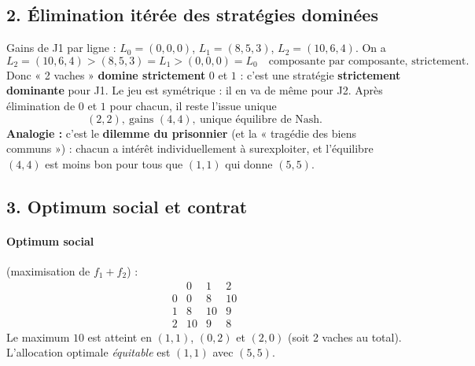 \documentclass[11pt,a4paper]{article}
\begin{document}
\subsection*{2. Élimination itérée des stratégies dominées}
Gains de J1 par ligne : $L_0=(0,0,0)$, $L_1=(8,5,3)$, $L_2=(10,6,4)$. On a
\[
L_2=(10,6,4)>(8,5,3)=L_1>(0,0,0)=L_0 \quad\text{composante par composante, strictement.}
\]
Donc « 2 vaches » \textbf{domine strictement} $0$ et $1$ : c'est une stratégie \textbf{strictement dominante} pour J1. Le jeu est symétrique : il en va de même pour J2. Après élimination de $0$ et $1$ pour chacun, il reste l'issue unique
\[
\boxed{(2,2),\ \text{gains } (4,4),\ \text{unique équilibre de Nash.}}
\]
\textbf{Analogie :} c'est le \textbf{dilemme du prisonnier} (et la « tragédie des biens communs ») : chacun a intérêt individuellement à surexploiter, et l'équilibre $(4,4)$ est moins bon pour tous que $(1,1)$ qui donne $(5,5)$.

\subsection*{3. Optimum social et contrat}
\paragraph{Optimum social} (maximisation de $f_1+f_2$) :
\[
\begin{array}{c|ccc}
 & 0 & 1 & 2\\\hline
0 & 0 & 8 & 10\\
1 & 8 & 10 & 9\\
2 & 10 & 9 & 8
\end{array}
\]
Le maximum $10$ est atteint en $(1,1)$, $(0,2)$ et $(2,0)$ (soit 2 vaches au total). L'allocation optimale \emph{équitable} est $(1,1)$ avec $(5,5)$.
\end{document}
